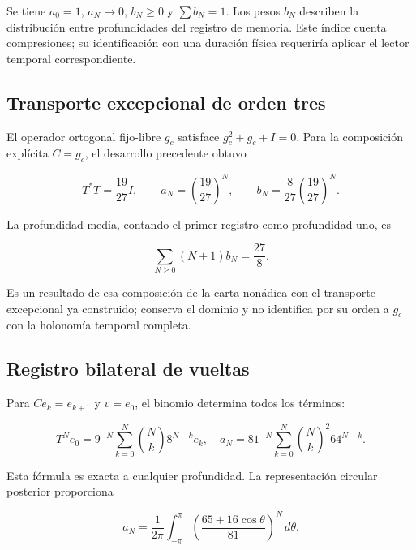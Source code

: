Se tiene \(a_0=1\), \(a_N\to0\), \(b_N\geq0\) y \(\sum b_N=1\). Los pesos \(b_N\) describen la distribución entre profundidades del registro de memoria. Este índice cuenta compresiones; su identificación con una duración física requeriría aplicar el lector temporal correspondiente.

\subsection{Transporte excepcional de orden tres}

El operador ortogonal fijo-libre \(g_c\) satisface \(g_c^2+g_c+I=0\). Para la composición explícita \(C=g_c\), el desarrollo precedente obtuvo

\begin{equation}
T^*T=\frac{19}{27}I,
\qquad a_N=\left(\frac{19}{27}\right)^N,
\qquad b_N=\frac8{27}\left(\frac{19}{27}\right)^N.
\label{x_reciprocidad:nuc03:eq:16}
\end{equation}

La profundidad media, contando el primer registro como profundidad uno, es

\begin{equation}
\sum_{N\geq0}(N+1)b_N=\frac{27}{8}.
\label{x_reciprocidad:nuc03:eq:17}
\end{equation}

Es un resultado de esa composición de la carta nonádica con el transporte excepcional ya construido; conserva el dominio y no identifica por su orden a \(g_c\) con la holonomía temporal completa.

\subsection{Registro bilateral de vueltas}

Para \(C e_k=e_{k+1}\) y \(v=e_0\), el binomio determina todos los términos:

\begin{equation}
T^Ne_0=9^{-N}\sum_{k=0}^{N}\binom{N}{k}8^{N-k}e_k,
\quad
a_N=81^{-N}\sum_{k=0}^{N}\binom{N}{k}^{\!2}64^{N-k}.
\label{x_reciprocidad:nuc03:eq:18}
\end{equation}

Esta fórmula es exacta a cualquier profundidad. La representación circular posterior proporciona

\begin{equation}
a_N=\frac1{2\pi}\int_{-\pi}^{\pi}
\left(\frac{65+16\cos\theta}{81}\right)^N\,d\theta.
\label{x_reciprocidad:nuc03:eq:19}
\end{equation}

